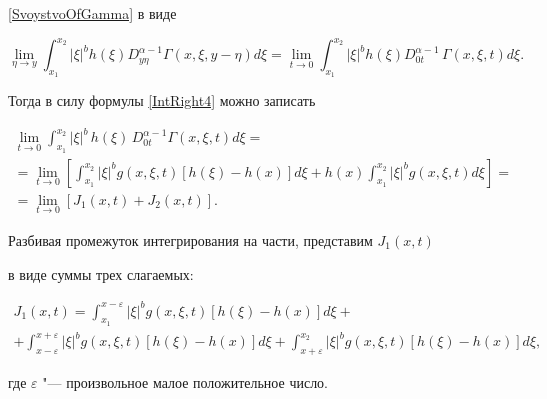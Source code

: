 \eqref{SvoystvoOfGamma} в виде

$$

\lim_{\eta \to y} \int _{x_1}^{x_2}

|\xi|^{b} h(\xi) D^{\alpha-1}_{y\eta} \Gamma(x,\xi,y-\eta) d\xi=

\lim_{t \to 0} \int _{x_1}^{x_2}

|\xi|^{b} h(\xi) D^{\alpha-1}_{0t}\,\Gamma(x,\xi,t)  d\xi.

$$

Тогда в силу формулы \eqref{IntRight4} можно записать

\begin{multline}

\lim_{t \to 0} \int _{x_1}^{x_2}

|\xi|^{b}\,h(\xi)\,D^{\alpha-1}_{0t} \Gamma(x,\xi,t) d\xi=

\\

=\lim_{t \to 0}\left[

\int _{x_1}^{x_2}

|\xi|^{b} g(x,\xi,t) [h(\xi)-h(x)] d\xi +h(x)\int _{x_1}^{x_2}

|\xi|^{b} g(x,\xi,t) d\xi  \right]=

\\

=\lim_{t \to 0}\left[J_1(x,t)+J_2(x,t)\right].

\end{multline}

Разбивая промежуток интегрирования на части, представим $J_1(x,t)$

  в виде суммы трех слагаемых:

\begin{multline}

J_1(x,t)=\int _{x_1}^{x-\varepsilon}

|\xi|^{b} g(x,\xi,t) [h(\xi)-h(x)] d\xi+

\\

\label{3Slagaemye}

+\int _{x-\varepsilon}^{x+\varepsilon}

|\xi|^{b} g(x,\xi,t) [h(\xi)-h(x)] d\xi+

\int _{x+\varepsilon}^{x_2}

|\xi|^{b} g(x,\xi,t) [h(\xi)-h(x)] d\xi, 

\end{multline}

где $\varepsilon$ "--- произвольное малое положительное число.





